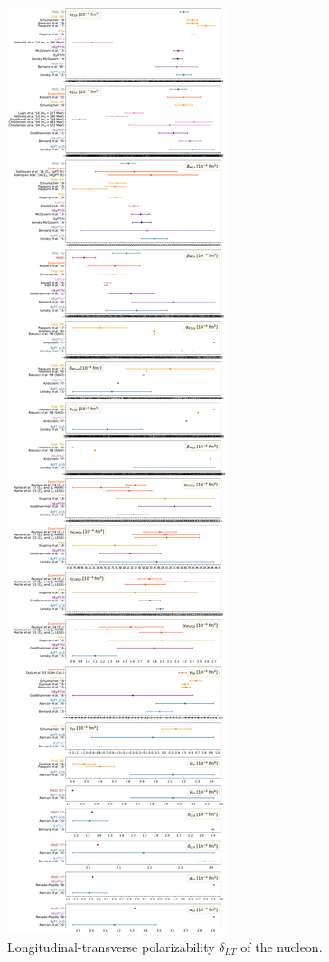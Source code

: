 \documentclass[preprints,review,accept,moreauthors,pdftex]{Definitions/mdpi}
\begin{document}
\begin{figure}[t]
\centering
\includegraphics[width=\columnwidth]{Figures/LTPolarizabilities.pdf}
\caption{Longitudinal-transverse polarizability $\delta_{LT}$ of the nucleon. \label{LTPolarizabilities}}
\end{figure} 
\end{document}
